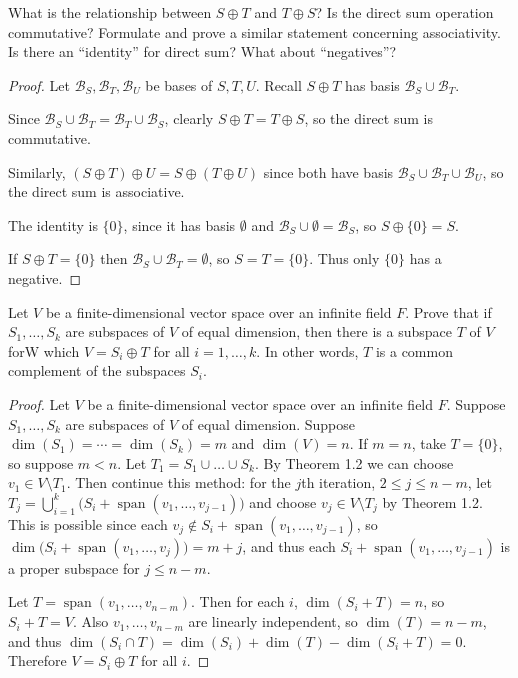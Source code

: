 \begin{tcolorbox}[title=Problem 13, breakable]
    What is the relationship between $S \oplus T$ and $T \oplus S$? Is the direct sum
    operation commutative? Formulate and prove a similar statement concerning
    associativity. Is there an ``identity'' for direct sum? What about ``negatives''?
\end{tcolorbox}

\begin{proof}
    Let $\mathcal{B}_S, \mathcal{B}_T, \mathcal{B}_U$ be bases of $S, T, U$.
    Recall $S \oplus T$ has basis $\mathcal{B}_S \cup \mathcal{B}_T$.

    Since $\mathcal{B}_S \cup \mathcal{B}_T = \mathcal{B}_T \cup \mathcal{B}_S$, clearly
    $S \oplus T = T \oplus S$, so the direct sum is commutative.

    Similarly, $(S \oplus T) \oplus U = S \oplus (T \oplus U)$ since both have basis
    $\mathcal{B}_S \cup \mathcal{B}_T \cup \mathcal{B}_U$, so the direct sum is associative.

    The identity is $\{0\}$, since it has basis $\emptyset$ and
    $\mathcal{B}_S \cup \emptyset = \mathcal{B}_S$, so $S \oplus \{0\} = S$.

    If $S \oplus T = \{0\}$ then $\mathcal{B}_S \cup \mathcal{B}_T = \emptyset$, so
    $S = T = \{0\}$. Thus only $\{0\}$ has a negative.
\end{proof}

\begin{tcolorbox}[title=Problem 14, breakable]
    Let $V$ be a finite-dimensional vector space over an infinite field $F$. Prove that if
    $S_1, \dots, S_k$ are subspaces of $V$ of equal dimension, then there is a subspace $T$
    of $V$ forW which $V = S_i \oplus T$ for all $i = 1, \dots, k$. In other words, $T$ is a
    common complement of the subspaces $S_i$.
\end{tcolorbox}

\begin{proof}
    Let $V$ be a finite-dimensional vector space over an infinite field $F$.
    Suppose $S_1, \dots, S_k$ are subspaces of $V$ of equal dimension.
    Suppose $\dim(S_1) = \cdots = \dim(S_k) = m$ and $\dim(V) = n$.
    If $m = n$, take $T = \{0\}$, so suppose $m < n$.
    Let $T_1 = S_1 \cup \ldots \cup S_k$.
    By Theorem 1.2 we can choose $v_1 \in V \setminus T_1$.
    Then continue this method: for the $j$th iteration, $2 \le j \le n - m$, let
        $T_j = \bigcup_{i=1}^{k} \big(S_i + \operatorname{span}(v_1, \dots, v_{j-1})\big)$
    and choose $v_j \in V \setminus T_j$ by Theorem 1.2.
    This is possible since each $v_j \notin S_i + \operatorname{span}(v_1, \dots, v_{j-1})$,
    so $\dim\big(S_i + \operatorname{span}(v_1, \dots, v_{j})\big) = m + j$, and thus each
    $S_i + \operatorname{span}(v_1, \dots, v_{j-1})$ is a proper subspace for $j \le n - m$.

    Let $T = \operatorname{span}(v_1, \dots, v_{n-m})$. Then for each $i$,
    $\dim(S_i + T) = n$, so $S_i + T = V$. Also $v_1, \dots, v_{n-m}$ are linearly
    independent, so $\dim(T) = n - m$, and thus
    $\dim(S_i \cap T) = \dim(S_i) + \dim(T) - \dim(S_i + T) = 0$.
    Therefore $V = S_i \oplus T$ for all $i$.
\end{proof}

